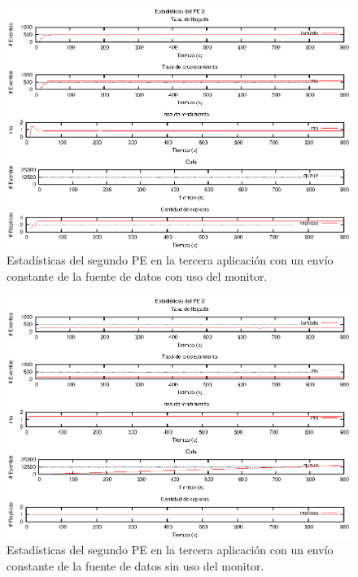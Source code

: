 \begin{figure}[!hptb]
\centering
	\includegraphics[scale=1.1]{images/exp/app3/cm/logical/statusTwoPE.eps}
    \caption{Estadísticas del segundo PE en la tercera aplicación con un envío constante de la fuente de datos con uso del monitor.}
    \label{fig:app3-statusTwoPE-cm}
\end{figure}

\begin{figure}[!hptb]
\centering
    \includegraphics[scale=1.1]{images/exp/app3/sm/logical/statusTwoPE.eps}
    \caption{Estadísticas del segundo PE en la tercera aplicación con un envío constante de la fuente de datos sin uso del monitor.}
    \label{fig:app3-statusTwoPE-sm}
\end{figure}

